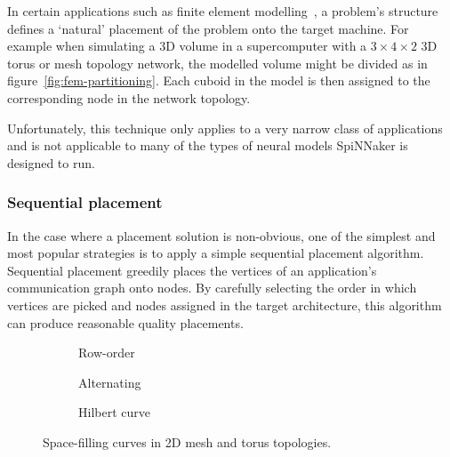 				In certain applications such as finite element
				modelling~\cite{bermejo13}, a problem's structure defines a `natural'
				placement of the problem onto the target machine. For example when
				simulating a 3D volume in a supercomputer with a $3 \times 4 \times 2$
				3D torus or mesh topology network, the modelled volume might be divided
				as in figure~\ref{fig:fem-partitioning}. Each cuboid in the model is
				then assigned to the corresponding node in the network topology.
				
				Unfortunately, this technique only applies to a very narrow class of
				applications and is not applicable to many of the types of neural
				models SpiNNaker is designed to run.
			
			\subsubsection{Sequential placement}
				
				In the case where a placement solution is non-obvious, one of the
				simplest and most popular strategies is to apply a simple sequential
				placement algorithm. Sequential placement greedily places the vertices
				of an application's communication graph onto nodes. By carefully
				selecting the order in which vertices are picked and nodes assigned in
				the target architecture, this algorithm can produce reasonable quality
				placements.
				
				\begin{figure}
					\center
					\begin{subfigure}{0.32\linewidth}
						\center
						\caption{Row-order}
						\label{fig:sequential-row-order}
					\end{subfigure}
					\begin{subfigure}{0.32\linewidth}
						\center
						\caption{Alternating}
						\label{fig:sequential-alternating}
					\end{subfigure}
					\begin{subfigure}{0.32\linewidth}
						\center
						\caption{Hilbert curve}
						\label{fig:sequential-hilbert}
					\end{subfigure}
					
					\caption{Space-filling curves in 2D mesh and torus topologies.}
					\label{fig:sequential}
				\end{figure}
				
